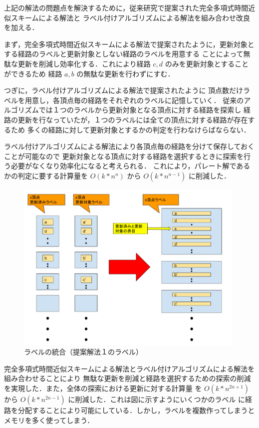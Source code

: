 \documentclass[12pt]{optlab-bachelor}
\begin{document}
上記の解法の問題点を解決するために，従来研究で提案された完全多項式時間近似スキームによる解法と
ラベル付けアルゴリズムによる解法を組み合わせ改良を加える．

まず，完全多項式時間近似スキームによる解法で提案されたように，更新対象とする経路のラベルと更新対象としない経路のラベルを用意する
ことによって無駄な更新を削減し効率化する．これにより経路 $c,d$ のみを更新対象とすることができるため
経路 $a,b$ の無駄な更新を行わずにすむ．

つぎに，ラベル付けアルゴリズムによる解法で提案されたように
頂点数だけラベルを用意し，各頂点毎の経路をそれぞれのラベルに記憶していく．
従来のアルゴリズムでは１つのラベルから更新対象となる頂点に対する経路を探索し
経路の更新を行なっていたが，１つのラベルには全ての頂点に対する経路が存在するため
多くの経路に対して更新対象とするかの判定を行わなけらばならない．

ラベル付けアルゴリズムによる解法により各頂点毎の経路を分けて保存しておくことが可能なので
更新対象となる頂点に対する経路を選択するときに探索を行う必要がなくなり効率化になると考えられる．
これにより，パレート解であるかの判定に要する計算量を $O(k*n^n)$ から $O(k*n^{n-1})$ に削減した．


\begin{figure}[htbp]
  \centering
  \caption{ラベルの統合（提案解法１のラベル）}
  \includegraphics[width=11.0cm]{fig/fig4.pdf}
\end{figure}

完全多項式時間近似スキームによる解法とラベル付けアルゴリズムによる解法を組み合わせることにより
無駄な更新を削減と経路を選択するための探索の削減を実現した．また，全体の探索における更新に対する計算量
を $O(k*n^{2n+1})$ から $O(k*n^{2n-1})$ に削減した．これは図に示すようにいくつかのラベル
に経路を分配することにより可能にしている．しかし，ラベルを複数作ってしまうとメモリを多く使ってしまう．
\end{document}
